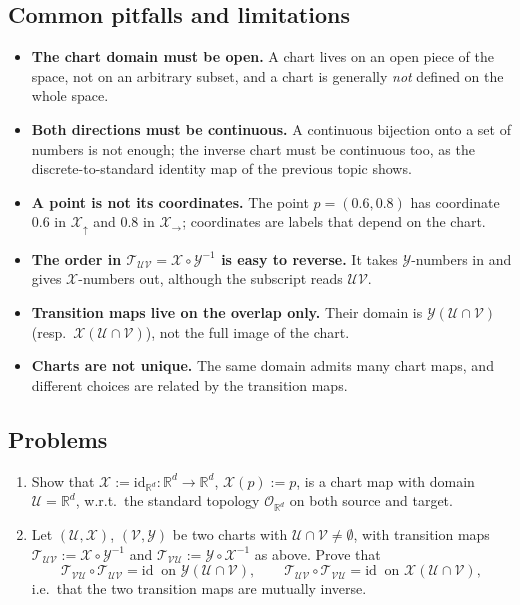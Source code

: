 \documentclass[11pt]{article}
\begin{document}
\subsection*{Common pitfalls and limitations}

\begin{itemize}
  \item \textbf{The chart domain must be open.} A chart lives on an open piece of the space, not on an arbitrary subset, and a chart is generally \emph{not} defined on the whole space.
  \item \textbf{Both directions must be continuous.} A continuous bijection onto a set of numbers is not enough; the inverse chart must be continuous too, as the discrete-to-standard identity map of the previous topic shows.
  \item \textbf{A point is not its coordinates.} The point $p=(0.6,0.8)$ has coordinate $0.6$ in $\mathcal X_\uparrow$ and $0.8$ in $\mathcal X_\to$; coordinates are labels that depend on the chart.
  \item \textbf{The order in $\mathcal T_{\mathcal{UV}}=\mathcal X\circ\mathcal Y^{-1}$ is easy to reverse.} It takes $\mathcal Y$-numbers in and gives $\mathcal X$-numbers out, although the subscript reads $\mathcal U\mathcal V$.
  \item \textbf{Transition maps live on the overlap only.} Their domain is $\mathcal Y(\mathcal U\cap\mathcal V)$ (resp.\ $\mathcal X(\mathcal U\cap\mathcal V)$), not the full image of the chart.
  \item \textbf{Charts are not unique.} The same domain admits many chart maps, and different choices are related by the transition maps.
\end{itemize}

\subsection*{Problems}

\begin{enumerate}[label=\textbf{3.\arabic*}, leftmargin=2.2cm, start=6]

\item \label{prob:id-chart}
Show that $\mathcal X:=\mathrm{id}_{\mathbb R^d}:\mathbb R^d\to\mathbb R^d$, $\mathcal X(p):=p$, is a chart map with domain $\mathcal U=\mathbb R^d$, w.r.t.\ the standard topology $\mathcal O_{\mathbb R^d}$ on both source and target.

\item \label{prob:transitions-mutually-inverse}
Let $(\mathcal U,\mathcal X)$, $(\mathcal V,\mathcal Y)$ be two charts with $\mathcal U\cap\mathcal V\neq\emptyset$, with transition maps $\mathcal T_{\mathcal{UV}}:=\mathcal X\circ\mathcal Y^{-1}$ and $\mathcal T_{\mathcal{VU}}:=\mathcal Y\circ\mathcal X^{-1}$ as above. Prove that
\[
\mathcal T_{\mathcal{VU}}\circ\mathcal T_{\mathcal{UV}}=\mathrm{id}\ \text{ on }\mathcal Y(\mathcal U\cap\mathcal V),
\qquad
\mathcal T_{\mathcal{UV}}\circ\mathcal T_{\mathcal{VU}}=\mathrm{id}\ \text{ on }\mathcal X(\mathcal U\cap\mathcal V),
\]
i.e.\ that the two transition maps are mutually inverse.

\end{enumerate}
\end{document}
